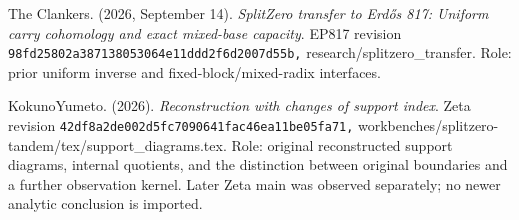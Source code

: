 The Clankers. (2026, September 14). \emph{SplitZero transfer to Erdős 817: Uniform carry cohomology and exact mixed-base capacity}. EP817 revision \nolinkurl{98fd25802a387138053064e11ddd2f6d2007d55b,} research/splitzero\_transfer. Role: prior uniform inverse and fixed-block/mixed-radix interfaces.

KokunoYumeto. (2026). \emph{Reconstruction with changes of support index}. Zeta revision \nolinkurl{42df8a2de002d5fc7090641fac46ea11be05fa71,} workbenches/splitzero-tandem/tex/support\_diagrams.tex. Role: original reconstructed support diagrams, internal quotients, and the distinction between original boundaries and a further observation kernel. Later Zeta main was observed separately; no newer analytic conclusion is imported.
